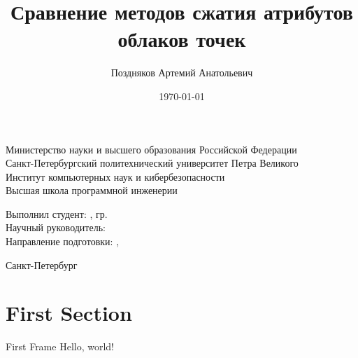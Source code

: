 \documentclass[aspectratio=169]{beamer}
\title{Сравнение методов сжатия атрибутов облаков точек}
\date{\today}
\author{Поздняков Артемий Анатольевич}
\institute{Высшая школа программной инженерии}
\begin{document}
  

  \begin{frame}

    \begin{center}
      \begin{scriptsize}
        Министерство науки и высшего образования Российской Федерации\\
        Санкт-Петербургский политехнический университет Петра Великого\\
        Институт компьютерных наук и кибербезопасности\\
        Высшая школа программной инженерии\\[5\baselineskip]
      \end{scriptsize}

      \Large\textbf{\Theme{}}
    \end{center}

    \begin{flushright}
      \begin{scriptsize}
        Выполнил студент: \textbf{\AuthorFull{}}, гр. \Group{}\\
        Научный руководитель: \SupervisorPosition{} \textbf{\SupervisorFull{}}\\
        Направление подготовки: \ProfileCode{}, \textbf{\ProfileName{}}\\
      \end{scriptsize}
    \end{flushright}

    \mbox{}\vfill

    \begin{center}
      \begin{scriptsize}
        Санкт-Петербург \\
        \the\year{}
      \end{scriptsize}
    \end{center}


  \end{frame}

  \section{First Section}
  \begin{frame}{First Frame}
    Hello, world!
  \end{frame}
\end{document}

